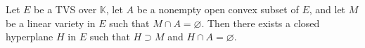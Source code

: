 Let $E$ be a TVS over $\mathbb{K}$, let $A$ be a nonempty open convex subset of $E$, and let $M$ be a linear variety in $E$ such that $M \cap A = \varnothing$. Then there exists a closed hyperplane $H$ in $E$ such that $H \supset M$ and $H \cap A = \varnothing$.